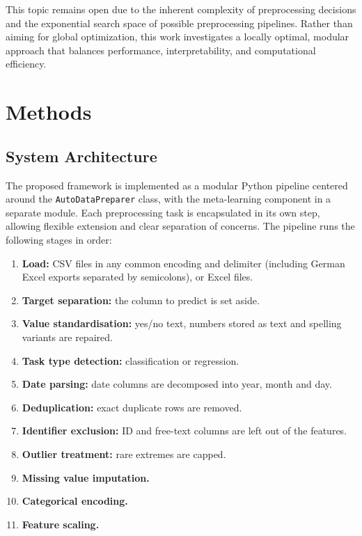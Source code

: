 \documentclass[11pt,a4paper]{article}
\begin{document}
This topic remains open due to the inherent complexity of preprocessing decisions and the exponential search space of possible preprocessing pipelines. Rather than aiming for global optimization, this work investigates a locally optimal, modular approach that balances performance, interpretability, and computational efficiency.

\section{Methods}

\subsection{System Architecture}

The proposed framework is implemented as a modular Python pipeline centered around the \texttt{AutoDataPreparer} class, with the meta-learning component in a separate module. Each preprocessing task is encapsulated in its own step, allowing flexible extension and clear separation of concerns. The pipeline runs the following stages in order:

\begin{enumerate}[noitemsep]
    \item \textbf{Load:} CSV files in any common encoding and delimiter (including German Excel exports separated by semicolons), or Excel files.
    \item \textbf{Target separation:} the column to predict is set aside.
    \item \textbf{Value standardisation:} yes/no text, numbers stored as text and spelling variants are repaired.
    \item \textbf{Task type detection:} classification or regression.
    \item \textbf{Date parsing:} date columns are decomposed into year, month and day.
    \item \textbf{Deduplication:} exact duplicate rows are removed.
    \item \textbf{Identifier exclusion:} ID and free-text columns are left out of the features.
    \item \textbf{Outlier treatment:} rare extremes are capped.
    \item \textbf{Missing value imputation.}
    \item \textbf{Categorical encoding.}
    \item \textbf{Feature scaling.}
\end{enumerate}
\end{document}
